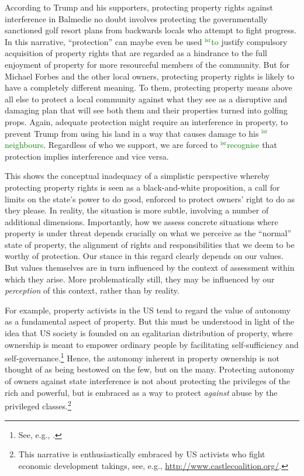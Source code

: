 \documentclass[12pt,a4paper]{book} %
\newcommand{\isr}[1]{\textcolor{green}{$^{\textrm{isr}}${#1}}}
\begin{document}
According to Trump and his supporters, protecting property rights against interference in Balmedie no doubt involves protecting the governmentally sanctioned golf resort plans from backwards locals who attempt to fight progress. In this narrative, ``protection'' can maybe even be used \isr{to} justify compulsory acquisition of property rights that are regarded as a hindrance to the full enjoyment of property for more resourceful members of the community. But for Michael Forbes and the other local owners, protecting property rights is likely to have a completely different meaning. To them, protecting property means above all else to protect a local community against what they see as a disruptive and damaging plan that will see both them and their properties turned into golfing props. Again, adequate protection might require an interference in property, to prevent Trump from using his land in a way that causes damage to his \isr{neighbours}. Regardless of who we support, we are forced to \isr{recognise} that protection implies interference and vice versa. 

This shows the conceptual inadequacy of a simplistic perspective whereby protecting property rights is seen as a black-and-white proposition, a call for limits on the state's power to do good, enforced to protect owners' right to do as they please. In reality, the situation is  more subtle, involving a number of additional dimensions. Importantly, how we assess concrete situations where property is under threat depends crucially on what we perceive as the ``normal'' state of property, the alignment of rights and responsibilities that we deem to be worthy of protection. Our stance in this regard clearly depends on our values. But values themselves are in turn influenced by the context of assessment within which they arise. More problematically still, they may be influenced by our \emph{perception} of this context, rather than by reality.

For example, property activists in the US tend to regard the value of autonomy as a fundamental aspect of property. But this must be understood in light of the idea that US society is founded on an egalitarian distribution of property, where ownership is meant to empower ordinary people by facilitating self-sufficiency and self-governance.\footnote{See, e.g., \cite[173]{ely07}.} Hence, the autonomy inherent in property ownership is not thought of as being bestowed on the few, but on the many. Protecting autonomy of owners against state interference is not about protecting the privileges of the rich and powerful, but is embraced as a way to protect {\it against} abuse by the privileged classes.\footnote{This narrative is enthusiastically embraced by US activists who fight economic development takings, see, e.g., \url{http://www.castlecoalition.org/}.} 
\end{document}
